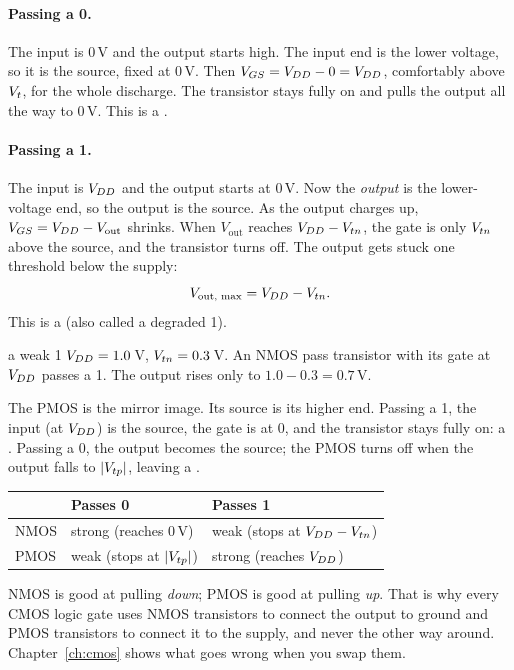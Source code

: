 \paragraph{Passing a 0.} The input is 0\,V and the output starts high. The input end is the lower voltage, so it is the source, fixed at 0\,V. Then $V_{GS} = V_{DD} - 0 = V_{DD}$, comfortably above $V_{t}$, for the whole discharge. The transistor stays fully on and pulls the output all the way to 0\,V. This is a .

\paragraph{Passing a 1.} The input is $V_{DD}$ and the output starts at 0\,V. Now the \emph{output} is the lower-voltage end, so the output is the source. As the output charges up, $V_{GS} = V_{DD} - V_{\text{out}}$ shrinks. When $V_{\text{out}}$ reaches $V_{DD} - V_{tn}$, the gate is only $V_{tn}$ above the source, and the transistor turns off. The output gets stuck one threshold below the supply:
\[
  V_{\text{out, max}} = V_{DD} - V_{tn}.
\]
This is a  (also called a degraded 1).

\begin{worked}{a weak 1}
$V_{DD} = 1.0$\,V, $V_{tn} = 0.3$\,V. An NMOS pass transistor with its gate at $V_{DD}$ passes a 1. The output rises only to $1.0 - 0.3 = 0.7$\,V.
\end{worked}

The PMOS is the mirror image. Its source is its higher end. Passing a 1, the input (at $V_{DD}$) is the source, the gate is at 0, and the transistor stays fully on: a . Passing a 0, the output becomes the source; the PMOS turns off when the output falls to $|V_{tp}|$, leaving a .

\begin{center}
\begin{tabular}{lll}
\toprule
 & Passes 0 & Passes 1 \\
\midrule
NMOS & strong (reaches 0\,V) & weak (stops at $V_{DD} - V_{tn}$) \\
PMOS & weak (stops at $|V_{tp}|$) & strong (reaches $V_{DD}$) \\
\bottomrule
\end{tabular}
\end{center}

\begin{bigidea}
NMOS is good at pulling \emph{down}; PMOS is good at pulling \emph{up}. That is why every CMOS logic gate uses NMOS transistors to connect the output to ground and PMOS transistors to connect it to the supply, and never the other way around. Chapter~\ref{ch:cmos} shows what goes wrong when you swap them.
\end{bigidea}

